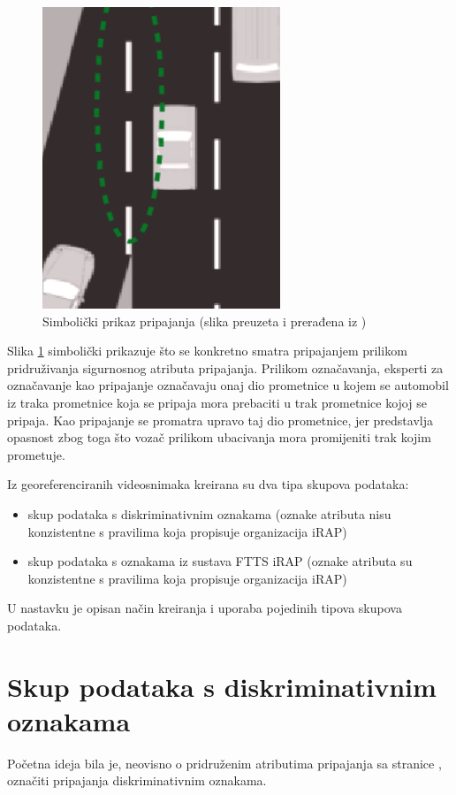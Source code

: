 \documentclass[times, utf8, diplomski, numeric]{fer}
\begin{document}
\begin{figure}[H]
\centering
\includegraphics[scale=0.75]{images/merge_lane.png}
\caption{Simbolički prikaz pripajanja (slika preuzeta i prerađena iz \citep{man:ftts_irap_coding_manual})}
\label{img:merge_lane_symbolic}
\end{figure}

\noindent Slika \ref{img:merge_lane_symbolic} simbolički prikazuje što se konkretno smatra pripajanjem prilikom pridruživanja sigurnosnog atributa pripajanja.
Prilikom označavanja, eksperti za označavanje kao pripajanje označavaju onaj dio prometnice u kojem se automobil iz traka prometnice koja se pripaja mora prebaciti u trak prometnice kojoj se pripaja.
Kao pripajanje se promatra upravo taj dio prometnice, jer predstavlja opasnost zbog toga što vozač prilikom ubacivanja mora promijeniti trak kojim prometuje.

Iz georeferenciranih videosnimaka kreirana su dva tipa skupova podataka:
\begin{itemize}
 \item skup podataka s diskriminativnim oznakama (oznake atributa nisu konzistentne s pravilima koja propisuje organizacija iRAP)
 \item skup podataka s oznakama iz sustava FTTS iRAP (oznake atributa su konzistentne s pravilima koja propisuje organizacija iRAP)
\end{itemize}
U nastavku je opisan način kreiranja i uporaba pojedinih tipova skupova podataka.

\section{Skup podataka s diskriminativnim oznakama}
Početna ideja bila je, neovisno o pridruženim atributima pripajanja sa stranice \citep{url:ftts_irap}, označiti pripajanja diskriminativnim oznakama. 
\end{document}
